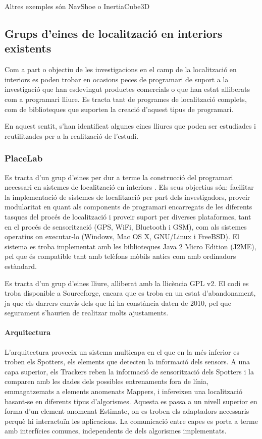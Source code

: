 Altres exemples són NavShoe \cite{krach} o InertiaCube3D


\subsection{Grups d’eines de localització en interiors existents}

Com a part o objectiu de les investigacions en el camp de la localització en interiors es poden trobar en ocasions peces de programari de suport a la investigació que han esdevingut productes comercials o que han estat alliberats com a programari lliure. Es tracta tant de programes de localització complets, com de biblioteques que suporten la creació d'aquest tipus de programari.

En aquest sentit, s'han identificat algunes eines lliures que poden ser estudiades i reutilitzades per a la realització de l'estudi.

\subsubsection{PlaceLab}

Es tracta d’un grup d’eines per dur a terme la construcció del programari necessari en sistemes de localització en interiors \cite{sohn}. Els seus objectius són: facilitar la implementació de sistemes de localització per part dels investigadors, proveir modularitat en quant als components de programari encarregats de les diferents tasques del procés de localització i proveir suport per diverses plataformes, tant en el procés de sensorització (GPS, WiFi, Bluetooth i GSM), com als sistemes operatius on executar-lo (Windows, Mac OS X, GNU/Linux i FreeBSD). El sistema es troba implementat amb les biblioteques Java 2 Micro Edition (J2ME), pel que és compatible tant amb telèfons mòbils antics com amb ordinadors estàndard.

Es tracta d’un grup d’eines lliure, alliberat amb la llicència GPL v2. El codi es troba disponible a Sourceforge, encara que es troba en un estat d’abandonament, ja que els darrers canvis dels que hi ha constància daten de 2010, pel que segurament s’haurien de realitzar molts ajustaments.

\paragraph{Arquitectura}

L'arquitectura proveeix un sistema multicapa en el que en la més inferior es troben els Spotters, els elements que detecten la informació dels sensors. A una capa superior, els Trackers reben la informació de sensorització dels Spotters i la comparen amb les dades dels possibles entrenaments fora de línia, emmagatzemats a elements anomenats Mappers, i infereixen una localització basant-se en diferents tipus d’algorismes. Aquesta es passa a un nivell superior en forma d'un element anomenat Estimate, on es troben els adaptadors necessaris perquè hi interactuïn les aplicacions. La comunicació entre capes es porta a terme amb interfícies comunes, independents de dels algorismes implementats.

